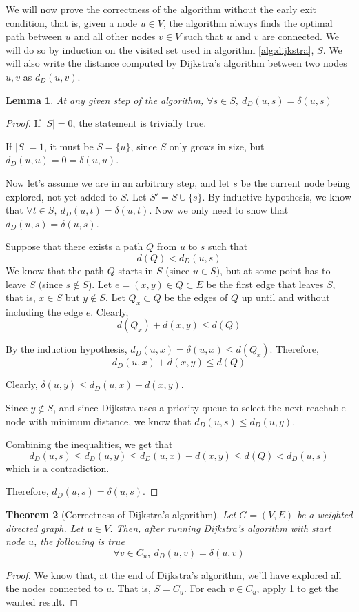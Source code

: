 \documentclass[a4paper,10pt]{report}
\newtheorem{theorem}{Theorem}[chapter]
\newtheorem{lemma}[theorem]{Lemma}
\begin{document}
We will now prove the correctness of the algorithm without the early exit condition, that is, given a node $u \in V$, the algorithm always finds the optimal path between $u$ and all other nodes $v \in V$ such that $u$ and $v$ are connected. We will do so by induction on the visited set used in algorithm \ref{alg:dijkstra}, $S$. We will also write the distance computed by Dijkstra's algorithm between two nodes $u, v$ as $d_D(u, v)$.

\begin{lemma}
\label{lemma:dijkstra}
At any given step of the algorithm, $\forall s \in S,\ d_D(u, s) = \delta(u, s)$
\end{lemma}
\begin{proof}
If $|S| = 0$, the statement is trivially true.

If $|S| = 1$, it must be $S = \{u\}$, since $S$ only grows in size, but $d_D(u, u) = 0 = \delta(u, u)$.

Now let's assume we are in an arbitrary step, and let $s$ be the current node being explored, not yet added to $S$. Let $S' = S \cup \{s\}$. By inductive hypothesis, we know that $\forall t \in S,\ d_D(u, t) = \delta(u, t)$. Now we only need to show that $d_D(u, s) = \delta(u, s)$.

Suppose that there exists a path $Q$ from $u$ to $s$ such that
\[d(Q) < d_D(u, s)\]
We know that the path $Q$ starts in $S$ (since $u \in S$), but at some point has to leave $S$ (since $s \not\in S$). Let $e = (x, y) \in Q \subset E$ be the first edge that leaves $S$, that is, $x \in S$ but $y \not\in S$. Let $Q_x \subset Q$ be the edges of $Q$ up until and without including the edge $e$. Clearly,
\[d(Q_x) + d(x, y) \le d(Q)\]

By the induction hypothesis, $d_D(u, x) = \delta(u, x) \le d(Q_x)$. Therefore,
\[ d_D(u, x) + d(x, y) \le d(Q) \]

Clearly, $\delta(u, y) \le d_D(u, x) + d(x, y)$.

Since $y \not\in S$, and since Dijkstra uses a priority queue to select the next reachable node with minimum distance, we know that $d_D(u, s) \le d_D(u, y)$.

Combining the inequalities, we get that
\[ d_D(u, s) \le d_D(u, y) \le d_D(u, x) + d(x, y) \le d(Q) < d_D(u, s) \]
which is a contradiction.

Therefore, $d_D(u, s) = \delta(u, s)$.
\end{proof}

\begin{theorem}[Correctness of Dijkstra's algorithm]
\label{thm:dijkstra}
Let $G = (V, E)$ be a weighted directed graph. Let $u \in V$. Then, after running Dijkstra's algorithm with start node $u$, the following is true
\[ \forall v \in C_u,\  d_D(u, v) = \delta(u, v) \]
\end{theorem}
\begin{proof}
We know that, at the end of Dijkstra's algorithm, we'll have explored all the nodes connected to $u$. That is, $S = C_u$. For each $v \in C_u$, apply \ref{lemma:dijkstra} to get the wanted result.
\end{proof}
\end{document}
